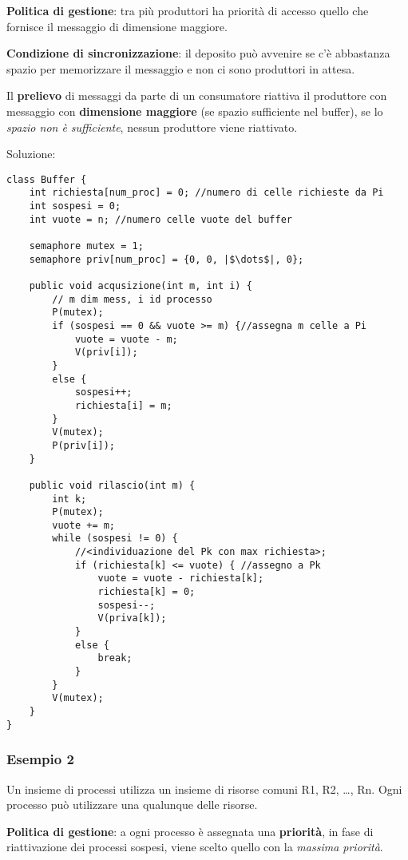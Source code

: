 \textbf{Politica di gestione}: tra più produttori ha priorità di accesso quello che fornisce il messaggio di dimensione maggiore.

\textbf{Condizione di sincronizzazione}: il deposito può avvenire se c'è abbastanza spazio per memorizzare il messaggio e non ci sono produttori in attesa.

Il \textbf{prelievo} di messaggi da parte di un consumatore riattiva il produttore con messaggio con \textbf{dimensione maggiore} (se spazio sufficiente nel buffer), se lo \textit{spazio non è sufficiente}, nessun produttore viene riattivato.

Soluzione:
\begin{verbatim}
class Buffer {
    int richiesta[num_proc] = 0; //numero di celle richieste da Pi
    int sospesi = 0;
    int vuote = n; //numero celle vuote del buffer

    semaphore mutex = 1;
    semaphore priv[num_proc] = {0, 0, |$\dots$|, 0};

    public void acqusizione(int m, int i) {
        // m dim mess, i id processo
        P(mutex);
        if (sospesi == 0 && vuote >= m) {//assegna m celle a Pi
            vuote = vuote - m;
            V(priv[i]);
        }
        else {
            sospesi++;
            richiesta[i] = m;
        }
        V(mutex);
        P(priv[i]);
    }
    
    public void rilascio(int m) {
        int k;
        P(mutex);
        vuote += m;
        while (sospesi != 0) {
            //<individuazione del Pk con max richiesta>;
            if (richiesta[k] <= vuote) { //assegno a Pk
                vuote = vuote - richiesta[k];
                richiesta[k] = 0;
                sospesi--;
                V(priva[k]);
            }
            else {
                break;
            }
        }
        V(mutex);
    }
}
\end{verbatim}

\subsubsection{Esempio 2}
Un insieme di processi utilizza un insieme di risorse comuni R1, R2, \dots, Rn. Ogni processo può utilizzare una qualunque delle risorse.

\textbf{Politica di gestione}: a ogni processo è assegnata una \textbf{priorità}, in fase di riattivazione dei processi sospesi, viene scelto quello con la \textit{massima priorità}.


